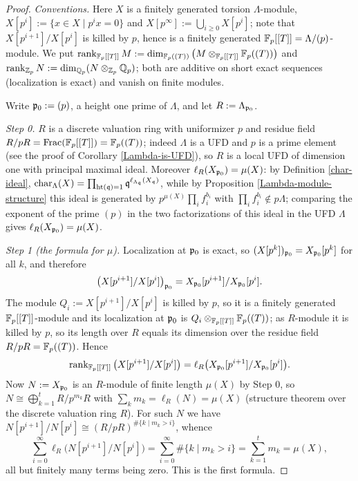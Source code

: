 \begin{proof}
\emph{Conventions.}
Here $X$ is a finitely generated torsion $\Lambda$-module,
$X[p^i]:=\{x\in X\mid p^ix=0\}$ and $X[p^\infty]:=\bigcup_{i\geq 0}X[p^i]$;
note that $X[p^{i+1}]/X[p^i]$ is killed by $p$, hence is a finitely generated
${\mathbb {F}}_p[[T]]=\Lambda/(p)$-module. We put
$\operatorname{rank}_{{\mathbb {F}}_p[[T]]}M:=\dim_{{\mathbb {F}}_p((T))}\big(M\otimes_{{\mathbb {F}}_p[[T]]}{\mathbb {F}}_p((T))\big)$
and $\operatorname{rank}_{{\mathbb {Z}}_p}N:=\dim_{{\mathbb {Q}}_p}(N\otimes_{{\mathbb {Z}}_p}{\mathbb {Q}}_p)$;
both are additive on short exact sequences (localization is exact) and vanish on
finite modules.

Write ${\mathfrak{p}}_0:=(p)$, a height one prime of $\Lambda$, and let $R:=\Lambda_{{\mathfrak{p}}_0}$.

\emph{Step 0.}
$R$ is a discrete valuation ring with uniformizer $p$ and residue field
$R/pR={\mathrm{Frac}}({\mathbb {F}}_p[[T]])={\mathbb {F}}_p((T))$; indeed $\Lambda$ is a UFD and $p$ is a prime
element (see the proof of Corollary \ref{Lambda-is-UFD}), so $R$ is a local UFD
of dimension one with principal maximal ideal.
Moreover $\ell_R(X_{{\mathfrak{p}}_0})=\mu(X)$: by Definition \ref{char-ideal},
$\operatorname{char}_\Lambda(X)=\prod_{{\mathrm{ht}}({\mathfrak{q}})=1}{\mathfrak{q}}^{\ell_{\Lambda_{\mathfrak{q}}}(X_{\mathfrak{q}})}$, while by
Proposition \ref{Lambda-module-structure} this ideal is generated by
$p^{\mu(X)}\prod_if_i^{b_i}$ with $\prod_if_i^{b_i}\notin p\Lambda$; comparing the
exponent of the prime $(p)$ in the two factorizations of this ideal in the UFD
$\Lambda$ gives $\ell_R(X_{{\mathfrak{p}}_0})=\mu(X)$.

\emph{Step 1 (the formula for $\mu$).}
Localization at ${\mathfrak{p}}_0$ is exact, so $(X[p^k])_{{\mathfrak{p}}_0}=X_{{\mathfrak{p}}_0}[p^k]$ for all
$k$, and therefore
$$\big(X[p^{i+1}]/X[p^i]\big)_{{\mathfrak{p}}_0}
=X_{{\mathfrak{p}}_0}[p^{i+1}]/X_{{\mathfrak{p}}_0}[p^i].$$
The module $Q_i:=X[p^{i+1}]/X[p^i]$ is killed by $p$, so it is a finitely
generated ${\mathbb {F}}_p[[T]]$-module and its localization at ${\mathfrak{p}}_0$ is
$Q_i\otimes_{{\mathbb {F}}_p[[T]]}{\mathbb {F}}_p((T))$; as $R$-module it is killed by $p$, so its
length over $R$ equals its dimension over the residue field
$R/pR={\mathbb {F}}_p((T))$. Hence
$$\operatorname{rank}_{{\mathbb {F}}_p[[T]]}\big(X[p^{i+1}]/X[p^i]\big)
=\ell_R\big(X_{{\mathfrak{p}}_0}[p^{i+1}]/X_{{\mathfrak{p}}_0}[p^i]\big).$$
Now $N:=X_{{\mathfrak{p}}_0}$ is an $R$-module of finite length $\mu(X)$ by Step 0, so
$N\cong\bigoplus_{k=1}^tR/p^{m_k}R$ with $\sum_km_k=\ell_R(N)=\mu(X)$
(structure theorem over the discrete valuation ring $R$).
For such $N$ we have $N[p^{i+1}]/N[p^i]\cong(R/pR)^{\#\{k\mid m_k>i\}}$, whence
$$\sum_{i=0}^\infty\ell_R\big(N[p^{i+1}]/N[p^i]\big)
=\sum_{i=0}^\infty\#\{k\mid m_k>i\}=\sum_{k=1}^tm_k=\mu(X),$$
all but finitely many terms being zero. This is the first formula.


\end{proof}
